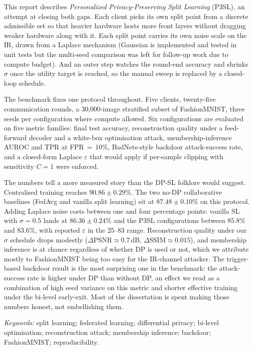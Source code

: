 \documentclass[11pt,a4paper,oneside]{report}
\begin{document}
This report describes \textit{Personalized Privacy-Preserving Split
Learning} (P3SL), an attempt at closing both gaps. Each client picks
its own split point from a discrete admissible set so that heavier
hardware hosts more front layers without dragging weaker hardware along
with it. Each split point carries its own noise scale on the IR, drawn
from a Laplace mechanism (Gaussian is implemented and tested in unit
tests but the multi-seed comparison was left for follow-up work due to
compute budget). And an outer step watches the round-end accuracy and
shrinks $\sigma$ once the utility target is reached, so the manual
sweep is replaced by a closed-loop schedule.

The benchmark fixes one protocol throughout. Five clients,
twenty-five communication rounds, a 30{,}000-image stratified subset
of FashionMNIST, three seeds per configuration where compute allowed.
Six configurations are evaluated on five metric families: final test
accuracy, reconstruction quality under a feed-forward decoder and a
white-box optimisation attack, membership-inference AUROC and TPR at
FPR\,$=$\,10\%, BadNets-style backdoor attack-success rate, and a
closed-form Laplace $\varepsilon$ that would apply if per-sample
clipping with sensitivity $C{=}1$ were enforced.

The numbers tell a more measured story than the DP-SL folklore would
suggest. Centralised training reaches $90.86 \pm 0.29\%$. The two
no-DP collaborative baselines (FedAvg and vanilla split learning) sit
at $87.48 \pm 0.10\%$ on this protocol. Adding Laplace noise costs
between one and four percentage points: vanilla SL with $\sigma{=}0.5$
lands at $86.36 \pm 0.24\%$ and the P3SL configurations between
$85.8\%$ and $83.6\%$, with reported $\varepsilon$ in the
$25$--$83$ range. Reconstruction quality under our $\sigma$ schedule
drops modestly ($\Delta\text{PSNR} \approx 0.7$\,dB,
$\Delta\text{SSIM} \approx 0.015$), and membership inference is at
chance regardless of whether DP is used or not, which we attribute
mostly to FashionMNIST being too easy for the IR-channel attacker.
The trigger-based backdoor result is the most surprising one in the
benchmark: the attack-success rate is higher under DP than without
DP, an effect we read as a combination of high seed variance on this
metric and shorter effective training under the bi-level early-exit.
Most of the dissertation is spent making those numbers honest, not
embellishing them.

\vspace{1em}\noindent\textit{Keywords:} split learning; federated
learning; differential privacy; bi-level optimisation; reconstruction
attack; membership inference; backdoor; FashionMNIST; reproducibility.
\end{document}
